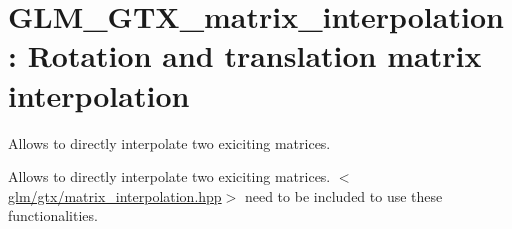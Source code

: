 \hypertarget{group__gtx__matrix__interpolation}{\section{\-G\-L\-M\-\_\-\-G\-T\-X\-\_\-matrix\-\_\-interpolation\-: \-Rotation and translation matrix interpolation}
\label{group__gtx__matrix__interpolation}
}


\-Allows to directly interpolate two exiciting matrices.  


\-Allows to directly interpolate two exiciting matrices. $<$\hyperlink{matrix__interpolation_8hpp}{glm/gtx/matrix\-\_\-interpolation.\-hpp}$>$ need to be included to use these functionalities. 